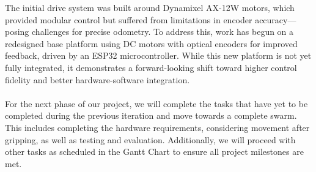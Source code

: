 The initial drive system was built around Dynamixel AX-12W motors, which provided modular control but suffered from limitations in encoder accuracy—posing challenges for precise odometry. To address this, work has begun on a redesigned base platform using DC motors with optical encoders for improved feedback, driven by an ESP32 microcontroller. While this new platform is not yet fully integrated, it demonstrates a forward-looking shift toward higher control fidelity and better hardware-software integration.
\paragraph*{}
For the next phase of our project, we will complete the tasks that have yet to be completed during the previous iteration and move towards a complete swarm. This includes completing the hardware requirements, considering movement after gripping, as well as testing and evaluation. Additionally, we will proceed with other tasks as scheduled in the Gantt Chart to ensure all project milestones are met.
